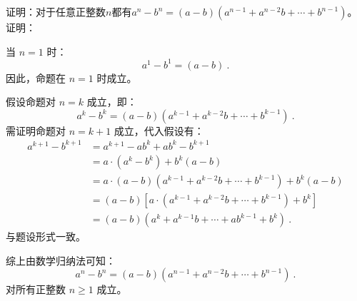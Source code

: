 \begin{example}{证明：对于任意正整数$n$都有$a^n-b^n=\left(a-b\right)\left(a^{n-1}+a^{n-2}b+\cdots+b^{n-1}\right)$。}
证明：

当 $n = 1$ 时：
\begin{equation}
a^1 - b^1 = (a - b)~.
\end{equation}
因此，命题在 $n = 1$ 时成立。

假设命题对 $n = k$ 成立，即：
\begin{equation}
a^k - b^k = (a - b)\left(a^{k-1} + a^{k-2}b + \cdots + b^{k-1}\right)~.
\end{equation}
需证明命题对 $n = k+1$ 成立，代入假设有：
\begin{equation}
\begin{aligned}
a^{k+1} - b^{k+1} &= a^{k+1}-ab^k+ab^k - b^{k+1}\\
&= a \cdot (a^k - b^k) + b^k(a - b)\\
&=a \cdot (a - b)\left(a^{k-1} + a^{k-2}b + \cdots + b^{k-1}\right) + b^k(a - b)\\
&=(a - b)\left[a \cdot \left(a^{k-1} + a^{k-2}b + \cdots + b^{k-1}\right) + b^k\right]\\
&=(a - b)\left(a^{k} + a^{k-1}b + \cdots + ab^{k-1} + b^k\right)~.
\end{aligned}
\end{equation}
与题设形式一致。

综上由数学归纳法可知：
\begin{equation}
a^n - b^n = (a - b)\left(a^{n-1} + a^{n-2}b + \cdots + b^{n-1}\right)~.
\end{equation}
对所有正整数 $n \geq 1$ 成立。
\end{example}

